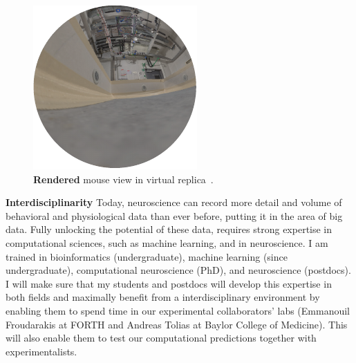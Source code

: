 \documentclass[B2,COG]{ercgrant}
\begin{document}
\begin{figure}
\vspace{-4ex}
\includegraphics[width=\linewidth]{figures/rendered.pdf}
\caption{\textbf{Rendered} mouse view in virtual replica~\parencite[from][]{Holmgren2021-jv}.}
\label{fig:replica}
\end{figure}
\textbf{Interdisciplinarity} 
Today, neuroscience can record more detail and volume  of  behavioral and physiological data than ever before, putting it in the area of big data. 
Fully unlocking the potential of these data, requires strong expertise in computational sciences, such as  machine learning, and in neuroscience. 
I am trained in bioinformatics (undergraduate), machine learning (since undergraduate), computational neuroscience (PhD), and neuroscience (postdocs).
I will make sure that my students and postdocs will develop this expertise in both fields and maximally benefit from a interdisciplinary environment by enabling them to spend time in our experimental collaborators’ labs (Emmanouil Froudarakis at FORTH and Andreas Tolias at Baylor College of Medicine).
This will also enable them to test our computational predictions together with experimentalists.
\end{document}
